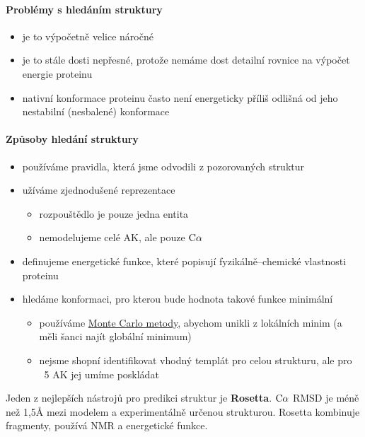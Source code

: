 \documentclass[DIV=8]{scrreprt}
\begin{document}
\paragraph{Problémy s hledáním struktury}
\begin{itemize}[nosep]
    \item je to výpočetně velice náročné
    \item je to stále dosti nepřesné, protože nemáme dost detailní rovnice na výpočet energie proteinu
    \item nativní konformace proteinu často není energeticky příliš odlišná od jeho nestabilní (nesbalené) konformace
\end{itemize}



\paragraph{Způsoby hledání struktury}
\begin{itemize}[nosep]
    \item používáme pravidla, která jsme odvodili z pozorovaných struktur
    \item užíváme zjednodušené reprezentace
\begin{itemize}[nosep]
    \item rozpouštědlo je pouze jedna entita
    \item nemodelujeme celé AK, ale pouze \(\ce{C\alpha}\)
\end{itemize}

    \item definujeme energetické funkce, které popisují fyzikálně--chemické vlastnosti proteinu
    \item hledáme konformaci, pro kterou bude hodnota takové funkce minimální
\begin{itemize}[nosep]
    \item používáme \href{https://cs.wikipedia.org/wiki/Metoda_Monte_Carlo}{Monte Carlo metody}, abychom unikli z lokálních minim (a měli šanci najít globální minimum)
    \item nejsme shopní identifikovat vhodný templát pro celou strukturu, ale pro ~5 AK jej umíme poskládat
\end{itemize}

\end{itemize}



Jeden z nejlepších nástrojů pro predikci struktur je \textbf{Rosetta}. \(\ce{C\alpha}\) RMSD je méně než 1,5Å mezi modelem a experimentálně určenou strukturou. Rosetta kombinuje fragmenty, používá NMR a energetické funkce.
\end{document}
